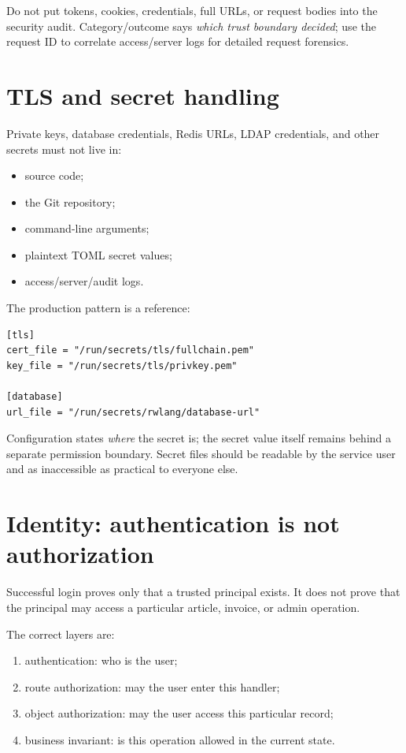 Do not put tokens, cookies, credentials, full URLs, or request bodies into the security audit. Category/outcome says \emph{which trust boundary decided}; use the request ID to correlate access/server logs for detailed request forensics.

\section{TLS and secret handling}

Private keys, database credentials, Redis URLs, LDAP credentials, and other secrets must not live in:

\begin{itemize}
  \item source code;
  \item the Git repository;
  \item command-line arguments;
  \item plaintext TOML secret values;
  \item access/server/audit logs.
\end{itemize}

The production pattern is a  reference:

\begin{lstlisting}
[tls]
cert_file = "/run/secrets/tls/fullchain.pem"
key_file = "/run/secrets/tls/privkey.pem"

[database]
url_file = "/run/secrets/rwlang/database-url"
\end{lstlisting}

Configuration states \emph{where} the secret is; the secret value itself remains behind a separate permission boundary. Secret files should be readable by the service user and as inaccessible as practical to everyone else.

\section{Identity: authentication is not authorization}

Successful login proves only that a trusted principal exists. It does not prove that the principal may access a particular article, invoice, or admin operation.

The correct layers are:

\begin{enumerate}
  \item authentication: who is the user;
  \item route authorization: may the user enter this handler;
  \item object authorization: may the user access this particular record;
  \item business invariant: is this operation allowed in the current state.
\end{enumerate}

